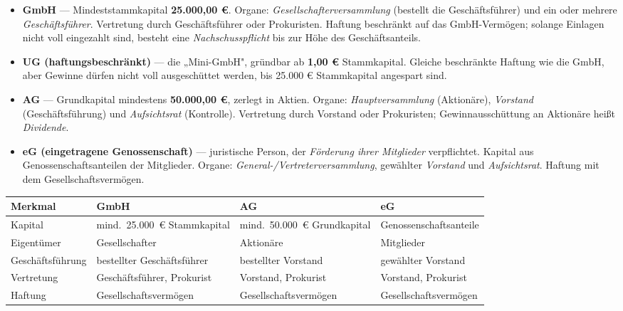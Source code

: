 \documentclass[11pt, a4paper]{article}
\begin{document}
\begin{itemize}
  \item \textbf{GmbH} --- Mindeststammkapital \textbf{25.000,00 €}. Organe:
    \emph{Gesellschafterversammlung} (bestellt die Geschäftsführer) und ein oder mehrere
    \emph{Geschäftsführer}. Vertretung durch Geschäftsführer oder Prokuristen. Haftung
    beschränkt auf das GmbH-Vermögen; solange Einlagen nicht voll eingezahlt sind, besteht
    eine \emph{Nachschusspflicht} bis zur Höhe des Geschäftsanteils.
  \item \textbf{UG (haftungsbeschränkt)} --- die „Mini-GmbH", gründbar ab
    \textbf{1,00 €} Stammkapital. Gleiche beschränkte Haftung wie die GmbH, aber Gewinne
    dürfen nicht voll ausgeschüttet werden, bis 25.000 € Stammkapital angespart sind.
  \item \textbf{AG} --- Grundkapital mindestens \textbf{50.000,00 €}, zerlegt in Aktien.
    Organe: \emph{Hauptversammlung} (Aktionäre), \emph{Vorstand} (Geschäftsführung) und
    \emph{Aufsichtsrat} (Kontrolle). Vertretung durch Vorstand oder Prokuristen;
    Gewinn\-ausschüttung an Aktionäre heißt \emph{Dividende}.
  \item \textbf{eG (eingetragene Genossenschaft)} --- juristische Person, der \emph{Förderung
    ihrer Mitglieder} verpflichtet. Kapital aus Genossenschaftsanteilen der Mitglieder.
    Organe: \emph{General-/Vertreterversammlung}, gewählter \emph{Vorstand} und
    \emph{Aufsichtsrat}. Haftung mit dem Gesellschaftsvermögen.
\end{itemize}

\begin{center}
\begin{tabular}{p{2.9cm} p{3.5cm} p{3.4cm} p{3.4cm}}
\toprule
\textbf{Merkmal} & \textbf{GmbH} & \textbf{AG} & \textbf{eG}\\
\midrule
Kapital & mind.\ 25.000~€ Stammkapital & mind.\ 50.000~€ Grundkapital & Genossenschafts\-anteile\\
Eigentümer & Gesellschafter & Aktionäre & Mitglieder\\
Geschäftsführung & bestellter Geschäftsführer & bestellter Vorstand & gewählter Vorstand\\
Vertretung & Geschäftsführer, Prokurist & Vorstand, Prokurist & Vorstand, Prokurist\\
Haftung & Gesellschafts\-vermögen & Gesellschafts\-vermögen & Gesellschafts\-vermögen\\
\bottomrule
\end{tabular}
\end{center}
\end{document}
